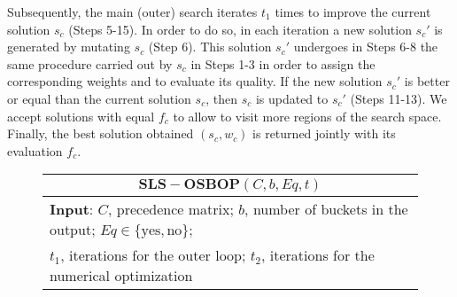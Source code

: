 \documentclass[preprint,12pt]{article}
\theoremstyle{definition}
\theoremstyle{remark}
\theoremstyle{example} %
\begin{document}
Subsequently, the main (outer) search iterates $t_1$ times  to improve the current solution $s_c$ (Steps 5-15). In order to do so, in each iteration a new solution $s_c'$ is generated by mutating $s_c$ (Step 6). This solution $s_c'$ undergoes in Steps 6-8 the same procedure carried out by  $s_c$ in Steps 1-3 in order to assign the corresponding weights and to evaluate its quality. 
If the new solution $s_c'$ is better or equal than the current solution $s_c$, then $s_c$ is updated to $s_c'$ (Steps 11-13). We accept solutions with equal $f_c$ to allow to visit more regions of the search space. Finally, the best solution obtained $(s_c,w_c)$ is returned jointly with its evaluation $f_c$.


\begin{figure}[htbp]\label{tab:lsosbop}
\centering
\begin{tabular}{ll}\hline
\multicolumn{2}{c}{$\mathbf{SLS-OSBOP}(C, b, Eq, t)$} \\ \hline
\multicolumn{2}{l}{{\bf Input}: $C$, precedence matrix; 
 $b$, number of buckets in the output; 
 $Eq\in \{ \text{yes},\text{no}\}$;}\\
\multicolumn{2}{l}{\hspace*{1.1cm} $t_1$, iterations for the outer loop; $t_2$, iterations for the numerical optimization}\\


\end{tabular}
\end{figure}
\end{document}
